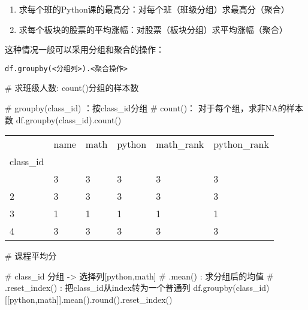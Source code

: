 \documentclass[
  letterpaper,
  DIV=11,
  numbers=noendperiod]{scrreprt}
\newenvironment{Shaded}{\begin{snugshade}}{\end{snugshade}}
\newcommand{\BuiltInTok}[1]{\textcolor[rgb]{0.00,0.23,0.31}{#1}}
\newcommand{\CommentTok}[1]{\textcolor[rgb]{0.37,0.37,0.37}{#1}}
\newcommand{\NormalTok}[1]{\textcolor[rgb]{0.00,0.23,0.31}{#1}}
\newcommand{\StringTok}[1]{\textcolor[rgb]{0.13,0.47,0.30}{#1}}
\providecommand{\tightlist}{%
  \setlength{\itemsep}{0pt}\setlength{\parskip}{0pt}}\usepackage{longtable,booktabs,array}
\begin{document}
\begin{enumerate}
\def\labelenumi{\arabic{enumi}.}
\tightlist
\item
  求每个班的Python课的最高分：对每个班（班级分组）求最高分（聚合）
\item
  求每个板块的股票的平均涨幅：对股票（板块分组）求平均涨幅（聚合）
\end{enumerate}

这种情况一般可以采用分组和聚合的操作：

\texttt{df.groupby(\textless{}分组列\textgreater{}).\textless{}聚合操作\textgreater{}}

\begin{Shaded}
\begin{Highlighting}[]
\CommentTok{\# 求班级人数: count()分组的样本数}

\CommentTok{\# groupby(\textquotesingle{}class\_id\textquotesingle{}) ：按class\_id分组}
\CommentTok{\# count()： 对于每个组，求非NA的样本数}
\NormalTok{df.groupby(}\StringTok{\textquotesingle{}class\_id\textquotesingle{}}\NormalTok{).count()}
\end{Highlighting}
\end{Shaded}

\begin{longtable}[]{@{}llllll@{}}
\toprule\noalign{}
& name & math & python & math\_rank & python\_rank \\
class\_id & & & & & \\
\midrule\noalign{}
\endhead
\bottomrule\noalign{}
\endlastfoot
1 & 3 & 3 & 3 & 3 & 3 \\
2 & 3 & 3 & 3 & 3 & 3 \\
3 & 1 & 1 & 1 & 1 & 1 \\
4 & 3 & 3 & 3 & 3 & 3 \\
\end{longtable}

\begin{Shaded}
\begin{Highlighting}[]
\CommentTok{\# 课程平均分}

\CommentTok{\# class\_id 分组 {-}\textgreater{} 选择列[\textquotesingle{}python\textquotesingle{},\textquotesingle{}math\textquotesingle{}] }
\CommentTok{\# .mean() : 求分组后的均值}
\CommentTok{\# .reset\_index() : 把class\_id从index转为一个普通列}
\NormalTok{df.groupby(}\StringTok{\textquotesingle{}class\_id\textquotesingle{}}\NormalTok{)[[}\StringTok{\textquotesingle{}python\textquotesingle{}}\NormalTok{,}\StringTok{\textquotesingle{}math\textquotesingle{}}\NormalTok{]].mean().}\BuiltInTok{round}\NormalTok{().reset\_index()}
\end{Highlighting}
\end{Shaded}
\end{document}
